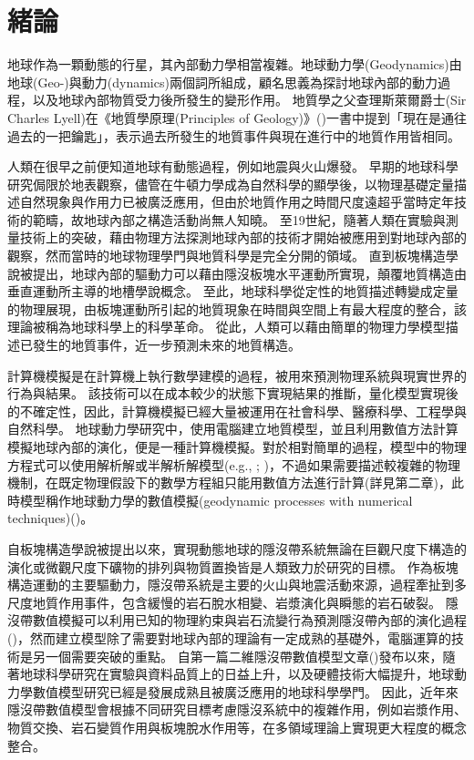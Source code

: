 
\chapter{緒論}

地球作為一顆動態的行星，其內部動力學相當複雜。地球動力學(Geodynamics)由地球(Geo-)與動力(dynamics)兩個詞所組成，顧名思義為探討地球內部的動力過程，以及地球內部物質受力後所發生的變形作用。
地質學之父查理斯萊爾爵士(Sir Charles Lyell)在《地質學原理(Principles of Geology)》(\citealp{lyell1837principles})一書中提到「現在是通往過去的一把鑰匙」，表示過去所發生的地質事件與現在進行中的地質作用皆相同。

人類在很早之前便知道地球有動態過程，例如地震與火山爆發。
早期的地球科學研究侷限於地表觀察，儘管在牛頓力學成為自然科學的顯學後，以物理基礎定量描述自然現象與作用力已被廣泛應用，但由於地質作用之時間尺度遠超乎當時定年技術的範疇，故地球內部之構造活動尚無人知曉。
至19世紀，隨著人類在實驗與測量技術上的突破，藉由物理方法探測地球內部的技術才開始被應用到對地球內部的觀察，然而當時的地球物理學門與地質科學是完全分開的領域。
直到板塊構造學說被提出，地球內部的驅動力可以藉由隱沒板塊水平運動所實現，顛覆地質構造由垂直運動所主導的地槽學說概念。
至此，地球科學從定性的地質描述轉變成定量的物理展現，由板塊運動所引起的地質現象在時間與空間上有最大程度的整合，該理論被稱為地球科學上的科學革命。
從此，人類可以藉由簡單的物理力學模型描述已發生的地質事件，近一步預測未來的地質構造。

計算機模擬是在計算機上執行數學建模的過程，被用來預測物理系統與現實世界的行為與結果。
該技術可以在成本較少的狀態下實現結果的推斷，量化模型實現後的不確定性，因此，計算機模擬已經大量被運用在社會科學、醫療科學、工程學與自然科學。
地球動力學研究中，使用電腦建立地質模型，並且利用數值方法計算模擬地球內部的演化，便是一種計算機模擬。對於相對簡單的過程，模型中的物理方程式可以使用解析解或半解析解模型(e.g., \citealp{samuel2006oscillating}; \citealp{montesi2007mantle})，不過如果需要描述較複雜的物理機制，在既定物理假設下的數學方程組只能用數值方法進行計算(詳見第二章)，此時模型稱作地球動力學的數值模擬(geodynamic processes with numerical techniques)(\citealp{101Geodynamics})。

自板塊構造學說被提出以來，實現動態地球的隱沒帶系統無論在巨觀尺度下構造的演化或微觀尺度下礦物的排列與物質置換皆是人類致力於研究的目標。
作為板塊構造運動的主要驅動力，隱沒帶系統是主要的火山與地震活動來源，過程牽扯到多尺度地質作用事件，包含緩慢的岩石脫水相變、岩漿演化與瞬態的岩石破裂。
隱沒帶數值模擬可以利用已知的物理約束與岩石流變行為預測隱沒帶內部的演化過程(\citealp{Gerya2011})，然而建立模型除了需要對地球內部的理論有一定成熟的基礎外，電腦運算的技術是另一個需要突破的重點。
自第一篇二維隱沒帶數值模型文章(\citealp{minear1970thermal})發布以來，隨著地球科學研究在實驗與資料品質上的日益上升，以及硬體技術大幅提升，地球動力學數值模型研究已經是發展成熟且被廣泛應用的地球科學學門。
因此，近年來隱沒帶數值模型會根據不同研究目標考慮隱沒系統中的複雜作用，例如岩漿作用、物質交換、岩石變質作用與板塊脫水作用等，在多領域理論上實現更大程度的概念整合。

